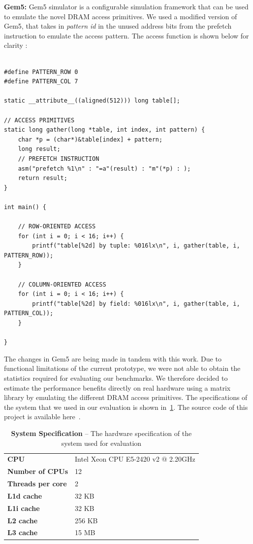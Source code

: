 \documentclass[letterpaper]{article}
\begin{document}
\textbf{Gem5:} Gem5 simulator is a configurable simulation framework that can
be used to emulate the novel DRAM access primitives. We used a modified version
of Gem5, that takes in \textit{pattern id} in the unused address bits from the
prefetch instruction to emulate the access pattern. The access function is 
shown below for clarity :

\begin{lstlisting}[caption={Gem5 DRAM Access Primitive
Simulation}]

#define PATTERN_ROW 0
#define PATTERN_COL 7

static __attribute__((aligned(512))) long table[];

// ACCESS PRIMITIVES
static long gather(long *table, int index, int pattern) {
    char *p = (char*)&table[index] + pattern;
    long result;
    // PREFETCH INSTRUCTION
    asm("prefetch %1\n" : "=a"(result) : "m"(*p) : );
    return result;
}

int main() {

	// ROW-ORIENTED ACCESS
	for (int i = 0; i < 16; i++) {
		printf("table[%2d] by tuple: %016lx\n", i, gather(table, i, PATTERN_ROW));
	}

	// COLUMN-ORIENTED ACCESS
	for (int i = 0; i < 16; i++) {
		printf("table[%2d] by field: %016lx\n", i, gather(table, i, PATTERN_COL));
	}

}
\end{lstlisting}
 
The changes in Gem5 are being made in tandem with this work. Due to functional
limitations of the current prototype, we were not able to obtain the statistics 
required for evaluating our benchmarks. 
We therefore decided to estimate the performance benefits directly on real
hardware using a matrix library by emulating the different DRAM access
primitives.
The specifications of the system that we used in our evaluation is shown
in~\cref{tab:spec}. The source code of this project is available
here~\cite{source15}.

\begin{table}
    \centering
    \begin{tabular}{l|l}
    \textbf{CPU} & Intel Xeon CPU E5-2420 v2 $@$ 2.20GHz\\
    \textbf{Number of CPUs} & 12 \\
    \textbf{Threads per core} & 2 \\
    \textbf{L1d cache} & 32 KB \\
	\textbf{L1i cache} & 32 KB \\
	\textbf{L2 cache} & 256 KB \\
	\textbf{L3 cache} & 15 MB \\
  	\end{tabular}
    \caption{
        \textbf{System Specification} -- The hardware specification of the
        system used for evaluation }
    \label{tab:spec}
\end{table}
\end{document}
